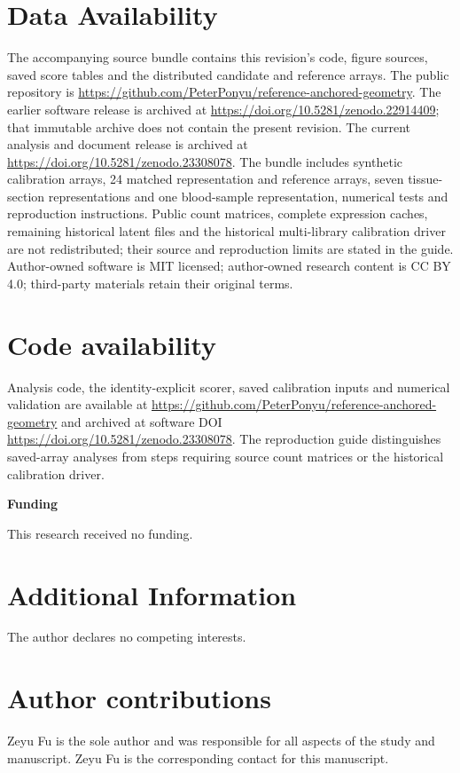 \documentclass[11pt]{article}
\begin{document}
\section*{Data Availability}
The accompanying source bundle contains this revision's code, figure sources, saved score tables and the distributed candidate and reference arrays. The public repository is \url{https://github.com/PeterPonyu/reference-anchored-geometry}. The earlier software release is archived at \url{https://doi.org/10.5281/zenodo.22914409}; that immutable archive does not contain the present revision. The current analysis and document release is archived at \url{https://doi.org/10.5281/zenodo.23308078}. The bundle includes synthetic calibration arrays, 24 matched representation and reference arrays, seven tissue-section representations and one blood-sample representation, numerical tests and reproduction instructions. Public count matrices, complete expression caches, remaining historical latent files and the historical multi-library calibration driver are not redistributed; their source and reproduction limits are stated in the guide. Author-owned software is MIT licensed; author-owned research content is CC BY 4.0; third-party materials retain their original terms.

\section*{Code availability}
Analysis code, the identity-explicit scorer, saved calibration inputs and numerical validation are available at \url{https://github.com/PeterPonyu/reference-anchored-geometry} and archived at software DOI \url{https://doi.org/10.5281/zenodo.23308078}. The reproduction guide distinguishes saved-array analyses from steps requiring source count matrices or the historical calibration driver.

\noindent\textbf{Funding}\par\nobreak

This research received no funding.



\section*{Additional Information}
The author declares no competing interests.

{\footnotesize\raggedright\setlength{\bibsep}{1pt}\setlength{\emergencystretch}{3em}

}

\section*{Author contributions}
Zeyu Fu is the sole author and was responsible for all aspects of the study and manuscript. Zeyu Fu is the corresponding contact for this manuscript.
\end{document}
